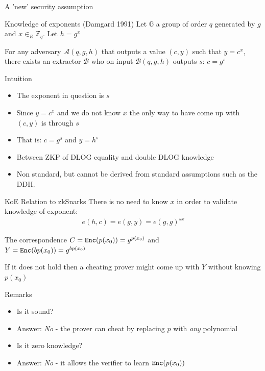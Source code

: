 \documentclass[handout]{beamer}
\begin{document}
\begin{frame}{A 'new' security assumption}
    \begin{block}{Knowledge of exponents (Damgard 1991)}
    Let $\mathbb{G}$ a group of order $q$ generated by $g$ and $x \in_R \mathbb{Z}_q$. Let $h = g^x$
    
    For any adversary $\mathcal{A}(q,g,h)$ that outputs a value $(c,y)$ such that $y=c^x$,
    there exists an extractor $\mathcal{B}$ who on input $\mathcal{B}(q,g,h)$ 
    outputs $s$: $c=g^s$
    \end{block}
    \pause
    \begin{block}{Intuition}
        \begin{itemize}
            \item The exponent in question is $s$
            \item Since $y=c^x$ and we do not know $x$ the only way to have come up with $(c,y)$ is 
                  through $s$
            \item That is: $c=g^s$ and $y=h^s$
            \item Between ZKP of DLOG equality and double DLOG knowledge
            \item Non standard, but cannot be derived from standard assumptions such as the DDH.
        \end{itemize}
    \end{block}   
\end{frame}

\begin{frame}{KoE Relation to zkSnarks}
There is no need to know $x$ in order to validate knowledge of exponent:
\begin{align*}
e(h,c) = e(g,y) = e(g,g)^{sx}
\end{align*}

\begin{block}{The correspondence}
$C=\mathtt{Enc}(p(x_0))=g^{p(x_0)}$ and \\
$Y=\mathtt{Enc}(bp(x_0))=g^{bp(x_0)}$
\end{block}
If it does not hold then a cheating prover might come up with $Y$ without knowing $p(x_0)$
\end{frame}

\begin{frame}{Remarks}
    \begin{itemize}
        \item Is it sound?
        \pause
        \item Answer: \emph{No} - the prover can cheat by replacing $p$ with \emph{any} polynomial
        \pause
        \item Is it zero knowledge?
        \pause
        \item Answer: \emph{No} - it allows the verifier to learn $\mathtt{Enc}(p(x_0))$
    \end{itemize}
\end{frame}
\end{document}
